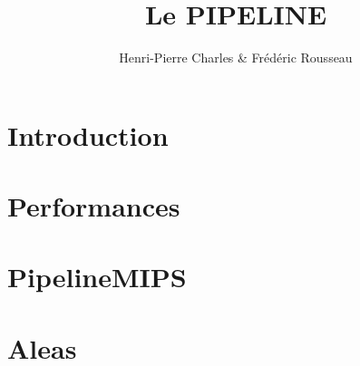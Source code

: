 \documentclass{beamer}
\title{Le PIPELINE}
\author{Henri-Pierre Charles \& Frédéric Rousseau}
\date{}
\newcommand{\Slide}[1]{}
\begin{document}
\begin{frame}
\titlepage
\end{frame}


\begin{frame}
\tableofcontents[ 
currentsubsection, 
hideothersubsections, 
sectionstyle=show/hide, 
subsectionstyle=show/shaded, 
] 
\end{frame}


\section{Introduction}
\Slide{Introduction/SlideIntro}
\Slide{Introduction/Principe}
\Slide{Introduction/AnalogieSansPipeline}
\Slide{Introduction/AnalogieAvecPipeline}

\section{Performances}
\Slide{Performances/Interet1}
\Slide{Performances/interet2}
\Slide{Performances/Interet3}

\section{PipelineMIPS}
\Slide{PipelineMIPS/ArchiMIPS1}
\Slide{PipelineMIPS/ArchiMIPS2}
\Slide{PipelineMIPS/ArchiMIPS3}

\section{Aleas}
\Slide{Aleas/PrincipeAleas}
\Slide{Aleas/ListeAleas}
\Slide{Aleas/Exemple}

%
%
%
\end{document}
